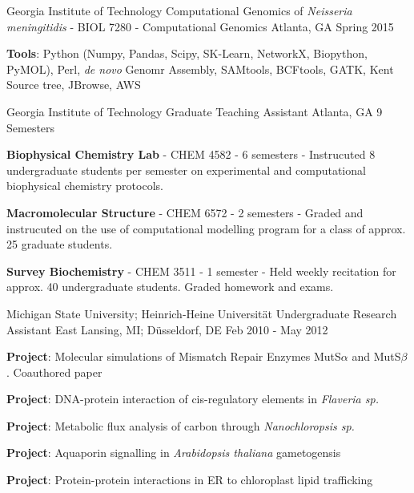 \begin{cventries}
  \cventry
    {Georgia Institute of Technology} %
    {Computational Genomics of \textit{Neisseria meningitidis} - BIOL 7280 - Computational Genomics} %
    {Atlanta, GA} %
    {Spring 2015} %
    {
      \begin{cvitems} %
        \item {\textbf{Tools}: Python {\tiny(Numpy, Pandas, Scipy, SK-Learn, NetworkX, Biopython, PyMOL)}, Perl, \textit{de novo} Genomr Assembly, SAMtools, BCFtools, GATK, Kent Source tree, JBrowse, AWS}
      \end{cvitems}
    }

  \cventry
    {Georgia Institute of Technology} %
    {Graduate Teaching Assistant} %
    {Atlanta, GA} %
    {9 Semesters} %
    {
      \begin{cvitems} %
        \item {\textbf{Biophysical Chemistry Lab} - CHEM 4582 - 6 semesters - Instrucuted 8 undergraduate students per semester on experimental and computational biophysical chemistry protocols.}
        \item {\textbf{Macromolecular Structure} - CHEM 6572 - 2 semesters - Graded and instrucuted on the use of computational modelling program for a class of approx. 25 graduate students.}
        \item {\textbf{Survey Biochemistry} - CHEM 3511 - 1 semester - Held weekly recitation for approx. 40 undergraduate students. Graded homework and exams.}
      \end{cvitems}
    }

  \cventry
    {Michigan State University; Heinrich-Heine Universit{\"a}t} %
    {Undergraduate Research Assistant} %
    {East Lansing, MI; D{\"u}sseldorf, DE} %
    {Feb 2010 - May 2012} %
    {
      \begin{cvitems} %
        \item {\textbf{Project}: Molecular simulations of Mismatch Repair Enzymes MutS$\alpha$ and MutS$\beta$. Coauthored paper}
        \item {\textbf{Project}: DNA-protein interaction of cis-regulatory elements in {\it Flaveria sp.}}
        \item {\textbf{Project}: Metabolic flux analysis of carbon through {\it Nanochloropsis sp.}}
        \item {\textbf{Project}: Aquaporin signalling in {\it Arabidopsis thaliana} gametogensis}
        \item {\textbf{Project}: Protein-protein interactions in ER to chloroplast lipid trafficking}
      \end{cvitems}
    }

\vspace{-4.0mm}
\end{cventries}

